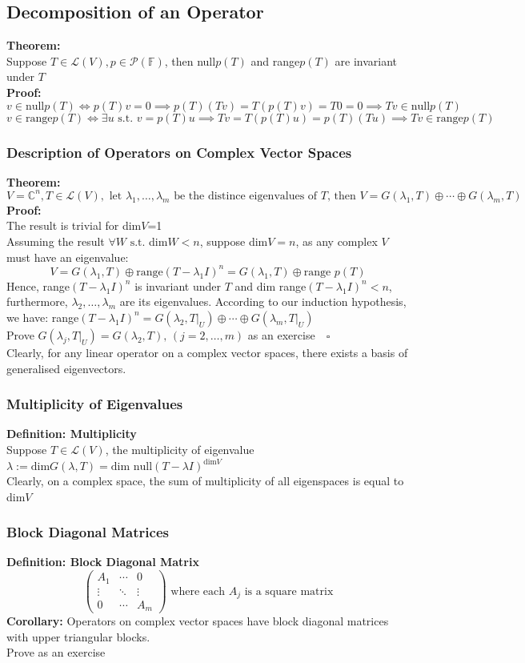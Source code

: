 \documentclass{article}
\newcommand{\F}{\mathbb{F}}
\newcommand{\st}{\mbox{ s.t. }}
\newcommand{\0}{{\bf{0}}}
\begin{document}
\subsection{Decomposition of an Operator}
\textbf{Theorem:}\\
Suppose $T\in\mathcal{L}(V),p\in\mathcal{P}(\F)$, then null$p(T)$ and range$p(T)$ are invariant under $T$\\
\textbf{Proof:}
$$v\in\mbox{null}p(T)\iff p(T)v=0\implies p(T)(Tv)=T(p(T)v)=T0=0\implies Tv\in\mbox{null}p(T)$$
$$v\in\mbox{range}p(T)\iff\exists u\st v=p(T)u\implies Tv=T(p(T)u)=p(T)(Tu)\implies Tv\in\mbox{range}p(T)$$
\subsubsection{Description of Operators on Complex Vector Spaces}
\textbf{Theorem:}
$$V=\mathbb{C}^n,T\in\mathcal{L}(V),\mbox{ let }\lambda_1,\dots,\lambda_m\mbox{ be the distince eigenvalues of }T\mbox{, then }V=G(\lambda_1,T)\oplus\cdots\oplus G(\lambda_m,T)$$
\textbf{Proof:}\\
The result is trivial for dim$V$=1\\
Assuming the result $\forall W\st$dim$W<n$, suppose dim$V=n$, as any complex $V$ must have an eigenvalue:
$$V=G(\lambda_1,T)\oplus\mbox{range}(T-\lambda_1I)^n=G(\lambda_1,T)\oplus\mbox{range }p(T)$$
Hence, range$(T-\lambda_1I)^n$ is invariant under $T$ and dim range$(T-\lambda_1I)^n<n$, furthermore, $\lambda_2,\dots,\lambda_m$ are its eigenvalues. According to our induction hypothesis, we have: range$(T-\lambda_1I)^n=G(\lambda_2,T|_U)\oplus\cdots\oplus G(\lambda_m,T|_U)$\\
\null\hfill{Prove $G(\lambda_j,T|_U)=G(\lambda_2,T),\,(j=2,\dots,m)$ as an exercise$\quad\square$}\\
Clearly, for any linear operator on a complex vector spaces, there exists a basis of generalised eigenvectors.
\subsubsection{Multiplicity of Eigenvalues}
\textbf{Definition: Multiplicity}\\
Suppose $T\in\mathcal{L}(V)$, the multiplicity of eigenvalue $\lambda:=\mbox{dim}G(\lambda,T)=\mbox{dim null}(T-\lambda I)^{\mbox{dim}V}$\\
Clearly, on a complex space, the sum of multiplicity of all eigenspaces is equal to dim$V$
\subsubsection{Block Diagonal Matrices}
\textbf{Definition: Block Diagonal Matrix}
$$\begin{pmatrix}
    A_1&\cdots&0\\
    \vdots&\ddots&\vdots\\
    0&\cdots&A_m
\end{pmatrix}\mbox{ where each }A_j\mbox{ is a square matrix}$$
\textbf{Corollary:} Operators on complex vector spaces have block diagonal matrices with upper triangular blocks.\\
\null\hfill{Prove as an exercise}
\end{document}
